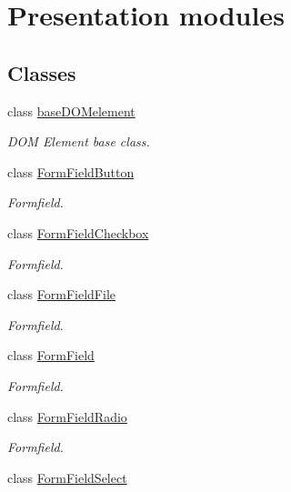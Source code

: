\section{Presentation modules}
\label{group__OWL__UI__LAYER}
\subsection*{Classes}
\begin{DoxyCompactItemize}
\item 
class \hyperlink{classbaseDOMelement}{baseDOMelement}
\begin{DoxyCompactList}\small\item\em DOM Element base class. \item\end{DoxyCompactList}\item 
class \hyperlink{classFormFieldButton}{FormFieldButton}
\begin{DoxyCompactList}\small\item\em Formfield. \item\end{DoxyCompactList}\item 
class \hyperlink{classFormFieldCheckbox}{FormFieldCheckbox}
\begin{DoxyCompactList}\small\item\em Formfield. \item\end{DoxyCompactList}\item 
class \hyperlink{classFormFieldFile}{FormFieldFile}
\begin{DoxyCompactList}\small\item\em Formfield. \item\end{DoxyCompactList}\item 
class \hyperlink{classFormField}{FormField}
\begin{DoxyCompactList}\small\item\em Formfield. \item\end{DoxyCompactList}\item 
class \hyperlink{classFormFieldRadio}{FormFieldRadio}
\begin{DoxyCompactList}\small\item\em Formfield. \item\end{DoxyCompactList}\item 
class \hyperlink{classFormFieldSelect}{FormFieldSelect}

\end{DoxyCompactItemize}
